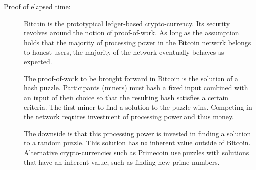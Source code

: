 \begin{description}\label{ID_1142331261}
\item[Proof of elapsed time:]\label{ID_1448411725}
Bitcoin is the prototypical ledger-based crypto-currency.\label{ID_878352987}
Its security revolves around the notion of proof-of-work.\label{ID_1836284802}
As long as the assumption holds that the majority of processing power in the Bitcoin network belongs to honest users, the majority of the network eventually behaves as expected.\cite[]{nakamoto2008bitcoin}\label{ID_1051235374}

The proof-of-work to be brought forward in Bitcoin is the solution of a hash puzzle. Participants (miners) must hash a fixed input combined with an input of their choice so that the resulting hash satisfies a certain criteria.\label{ID_148196853}
The first miner to find a solution to the puzzle wins.\label{ID_203871180}
Competing in the network requires investment of processing power and thus money.\label{ID_8052086}

The downside is that this processing power is invested in finding a solution to a random puzzle. This solution has no inherent value outside of Bitcoin.\label{ID_331211373}
Alternative crypto-currencies such as Primecoin use puzzles with solutions that have an inherent value, such as finding new prime numbers.\cite[]{king2013primecoin}\label{ID_1916667021}


\end{description}
